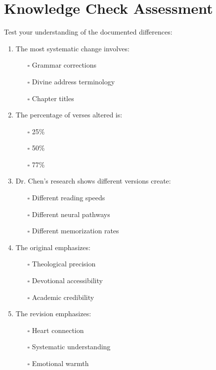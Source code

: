 \documentclass[11pt,twoside]{book}
\begin{document}
\section*{Knowledge Check Assessment}
\label{sec:orge1bf875}

Test your understanding of the documented differences:

\begin{enumerate}
\item The most systematic change involves:
\begin{itemize}
\item[{$\square$}] Grammar corrections
\item[{$\square$}] Divine address terminology
\item[{$\square$}] Chapter titles
\end{itemize}

\item The percentage of verses altered is:
\begin{itemize}
\item[{$\square$}] 25\%
\item[{$\square$}] 50\%
\item[{$\square$}] 77\%
\end{itemize}

\item Dr. Chen's research shows different versions create:
\begin{itemize}
\item[{$\square$}] Different reading speeds
\item[{$\square$}] Different neural pathways
\item[{$\square$}] Different memorization rates
\end{itemize}

\item The original emphasizes:
\begin{itemize}
\item[{$\square$}] Theological precision
\item[{$\square$}] Devotional accessibility
\item[{$\square$}] Academic credibility
\end{itemize}

\item The revision emphasizes:
\begin{itemize}
\item[{$\square$}] Heart connection
\item[{$\square$}] Systematic understanding
\item[{$\square$}] Emotional warmth
\end{itemize}
\end{enumerate}
\end{document}
